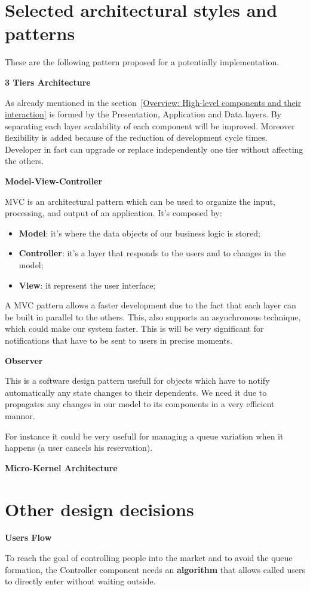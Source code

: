 \section{Selected architectural styles and patterns}
These are the following pattern proposed for a potentially implementation.

\textbf{3 Tiers Architecture} \par
As already mentioned in the section~\ref{Overview: High-level components and their interaction} is formed by the Presentation, Application and Data layers. By separating each layer scalability of each component will be improved.
Moreover flexibility is added because of the reduction of development cycle times. Developer in fact can upgrade or replace independently one tier without affecting the others. 

\textbf{Model-View-Controller} \par
MVC is an architectural pattern which can be used to organize the input, processing, and output of an application. It's composed by:
\begin{itemize}
\item \textbf{Model}: it's where the data objects of our business logic is stored;
\item \textbf{Controller}: it's a layer that responds to the users and to changes in the model;
\item \textbf{View}: it represent the user interface;
\end{itemize}

A MVC pattern allows a faster development due to the fact that each layer can be built in parallel to the others. This, also supports an asynchronous technique, which could make our system faster. This is will be very significant for notifications that have to be sent to users in precise moments.

\textbf{Observer} \par
This is a software design pattern usefull for objects which have to notify automatically any state changes to their dependents. We need it due to propagates any changes in our model to its components in a very efficient mannor.

For instance it could be very usefull for managing a queue variation when it happens (a user cancels his reservation).

\textbf{Micro-Kernel Architecture} \par




\section{Other design decisions}
\textbf{Users Flow} \par
To reach the goal of controlling people into the market and to avoid the queue formation, the Controller component needs an \textbf{algorithm} that allows called users to directly enter without waiting outside. 

